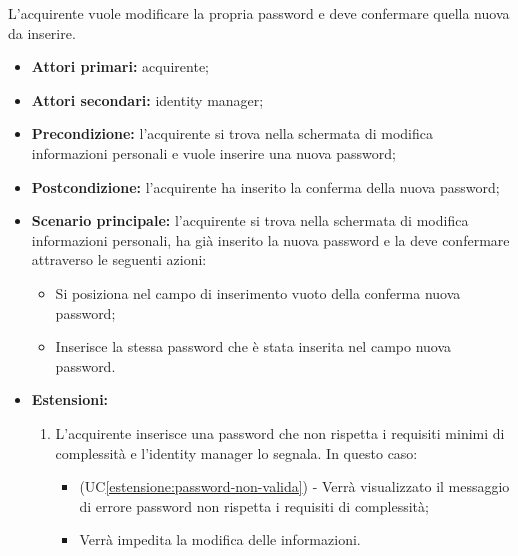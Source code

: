 L'acquirente vuole modificare la propria password e deve confermare quella nuova da inserire.
\begin{itemize}
    \item \textbf{Attori primari:} acquirente;
    \item \textbf{Attori secondari:} identity manager;
    \item \textbf{Precondizione:} l'acquirente si trova nella schermata di modifica informazioni personali e vuole inserire una nuova password;
    \item \textbf{Postcondizione:} l'acquirente ha inserito la conferma della nuova password;
    \item \textbf{Scenario principale:} l'acquirente si trova nella schermata di modifica informazioni personali, ha già inserito la nuova password e la deve confermare attraverso le seguenti azioni:
    \begin{itemize}
        \item Si posiziona nel campo di inserimento vuoto della conferma nuova password;
        \item Inserisce la stessa password che è stata inserita nel campo nuova password.
    \end{itemize}
    \item \textbf{Estensioni:}
    \begin{enumerate}[label=\lett]
        \item L'acquirente inserisce una password che non rispetta i requisiti minimi di complessità e l'identity manager lo segnala. In questo caso:
        \begin{itemize}
            \item (UC\ref{estensione:password-non-valida}) - Verrà visualizzato il messaggio di errore password non rispetta i requisiti di complessità;
            \item Verrà impedita la modifica delle informazioni.
        \end{itemize}
    \end{enumerate}
\end{itemize}


\label{eliminazione-account-acquirente}

